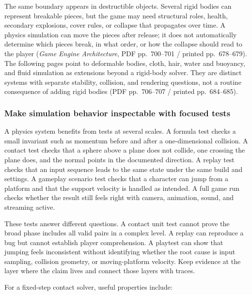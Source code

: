 The same boundary appears in destructible objects. Several rigid bodies can represent breakable pieces, but the game may need structural roles, health, secondary explosions, cover rules, or collapse that propagates over time. A physics simulation can move the pieces after release; it does not automatically determine which pieces break, in what order, or how the collapse should read to the player (\emph{Game Engine Architecture}, PDF pp.~700--701 / printed pp.~678--679). The following pages point to deformable bodies, cloth, hair, water and buoyancy, and fluid simulation as extensions beyond a rigid-body solver. They are distinct systems with separate stability, collision, and rendering questions, not a routine consequence of adding rigid bodies (PDF pp.~706--707 / printed pp.~684--685).

\subsubsection{Make simulation behavior inspectable with focused tests}\label{06-engine-ii-ch033-make-simulation-behavior-inspectable-with-focused-tests}

A physics system benefits from tests at several scales. A formula test checks a small invariant such as momentum before and after a one-dimensional collision. A contact test checks that a sphere above a plane does not collide, one crossing the plane does, and the normal points in the documented direction. A replay test checks that an input sequence leads to the same state under the same build and settings. A gameplay scenario test checks that a character can jump from a platform and that the support velocity is handled as intended. A full game run checks whether the result still feels right with camera, animation, sound, and streaming active.

These tests answer different questions. A contact unit test cannot prove the broad phase includes all valid pairs in a complex level. A replay can reproduce a bug but cannot establish player comprehension. A playtest can show that jumping feels inconsistent without identifying whether the root cause is input sampling, collision geometry, or moving-platform velocity. Keep evidence at the layer where the claim lives and connect those layers with traces.

For a fixed-step contact solver, useful properties include:


